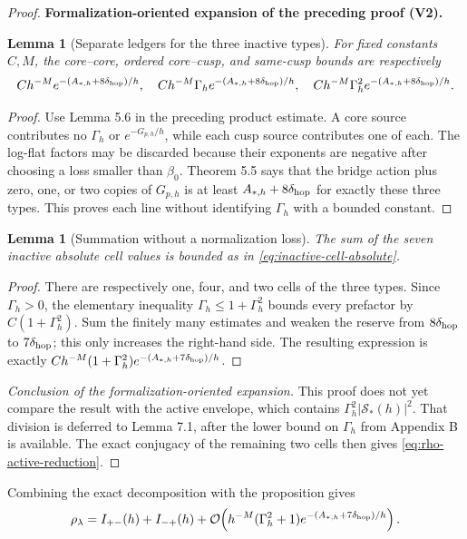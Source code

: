 \documentclass[11pt]{article}
\newtheorem{lemma}[theorem]{Lemma}
\newcommand{\formalisationparentid}{X}
\newenvironment{formalisationaddition}[1]{\par\medskip\begingroup\color{blue}\def\formalisationparentid{#1}\setcounter{formalizationsublemma}{0}\let\lemma\formalizationsublemma\let\endlemma\endformalizationsublemma
  \def\Eo{\mathcal E_h^\circ}\def\EE{\mathcal E_h}\def\phio{\phi_h^\circ}\def\phih{\phi_h}\def\Ho{H_h^{\rm atom}(v^\circ)}\def\Ha{H_h^{\rm atom}}\def\HL{H_h^{L}}\def\Dh{D_h}\def\Log{\operatorname{Log}}\def\ellh{\ell_h}\def\Gp{G_{p,h}}\def\Ast{A_{*,h}}\def\ahat{\widehat{\mathfrak a}_h}\def\ah{\mathfrak a_h}\def\rh{\widehat\rho_h}\def\deltah{\widehat\delta_h}\def\oldref##1{\textup{(##1)}}\def\interface##1{\par\noindent\textit{Analytical interface used here.} ##1\par}\def\finish{\par\noindent\textit{Conclusion of the formalization-oriented expansion.} }\par\noindent\textbf{Formalization-oriented expansion of the preceding proof (V2).}\par\smallskip
}{\par\endgroup\medskip
}
\newcommand{\cO}{\mathcal O}
\begin{document}
\begin{proof}
\begin{formalisationaddition}{P5.8}
\begin{lemma}[Separate ledgers for the three inactive types]\label{sublemma:P5-8-three-types}
For fixed constants $C,M$, the core--core, ordered core--cusp, and same-cusp bounds are respectively
\[
 Ch^{-M}e^{-(A_{*,h}+8\delta_{\rm hop})/h},\quad
 Ch^{-M}\Gamma_he^{-(A_{*,h}+8\delta_{\rm hop})/h},\quad
 Ch^{-M}\Gamma_h^2e^{-(A_{*,h}+8\delta_{\rm hop})/h}.
\]
\end{lemma}
\begin{proof}
Use Lemma 5.6 in the preceding product estimate. A core source contributes no $\Gamma_h$ or $e^{-G_{p,h}/h}$, while each cusp source contributes one of each. The log-flat factors may be discarded because their exponents are negative after choosing a loss smaller than $\beta_0$.
Theorem 5.5 says that the bridge action plus zero, one, or two copies of $G_{p,h}$ is at least $A_{*,h}+8\delta_{\rm hop}$ for exactly these three types. This proves each line without identifying $\Gamma_h$ with a bounded constant.
\end{proof}

\begin{lemma}[Summation without a normalization loss]\label{sublemma:P5-8-sum}
The sum of the seven inactive absolute cell values is bounded as in \eqref{eq:inactive-cell-absolute}.
\end{lemma}
\begin{proof}
There are respectively one, four, and two cells of the three types. Since $\Gamma_h>0$, the elementary inequality $\Gamma_h\le1+\Gamma_h^2$ bounds every prefactor by $C(1+\Gamma_h^2)$. Sum the finitely many estimates and weaken the reserve from $8\delta_{\rm hop}$ to $7\delta_{\rm hop}$; this only increases the right-hand side. The resulting expression is exactly
$Ch^{-M}(1+\Gamma_h^2)e^{-(A_{*,h}+7\delta_{\rm hop})/h}$.
\end{proof}
\finish This proof does not yet compare the result with the active envelope, which contains $\Gamma_h^2|\mathcal S_*(h)|^2$. That division is deferred to Lemma 7.1, after the lower bound on $\Gamma_h$ from Appendix B is available. The exact conjugacy of the remaining two cells then gives \eqref{eq:rho-active-reduction}.
\end{formalisationaddition}

\end{proof}

Combining the exact decomposition with the proposition gives
\begin{equation}\label{eq:rho-active-reduction}
 \rho_\lambda=I_{+-}(h)+I_{-+}(h)
 +\cO\!\left(h^{-M}(\Gamma_h^2+1)
 e^{-(A_{*,h}+7\delta_{\rm hop})/h}\right).
\end{equation}
\end{document}
